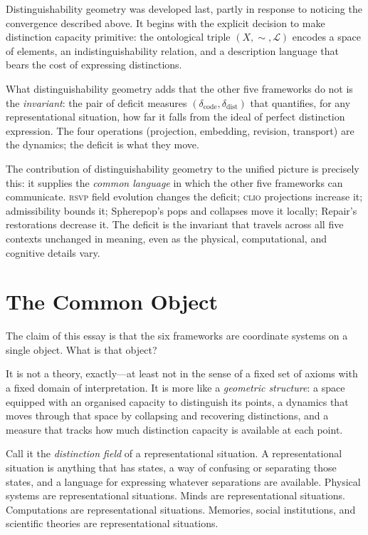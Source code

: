 \documentclass[12pt, letterpaper]{article}
\theoremstyle{remark}
\newcommand{\rsvp}{\textsc{rsvp}}
\newcommand{\clio}{\textsc{clio}}
\newcommand{\Dc}{\delta_{\mathrm{code}}}
\newcommand{\Dd}{\delta_{\mathrm{dist}}}
\begin{document}
Distinguishability geometry was developed last, partly in response to
noticing the convergence described above.  It begins with the explicit
decision to make distinction capacity primitive: the ontological triple
$(X, \sim, \mathcal{L})$ encodes a space of elements, an indistinguishability
relation, and a description language that bears the cost of expressing
distinctions.

What distinguishability geometry adds that the other five frameworks do not
is the \emph{invariant}: the pair of deficit measures $(\Dc, \Dd)$ that
quantifies, for any representational situation, how far it falls from the
ideal of perfect distinction expression.  The four operations (projection,
embedding, revision, transport) are the dynamics; the deficit is what
they move.

The contribution of distinguishability geometry to the unified picture is
precisely this: it supplies the \emph{common language} in which the other
five frameworks can communicate.  \rsvp{} field evolution changes the
deficit; \clio{} projections increase it; admissibility bounds it;
Spherepop's pops and collapses move it locally; Repair's restorations
decrease it.  The deficit is the invariant that travels across all five
contexts unchanged in meaning, even as the physical, computational, and
cognitive details vary.

\section{The Common Object}

The claim of this essay is that the six frameworks are coordinate systems
on a single object.  What is that object?

It is not a theory, exactly---at least not in the sense of a fixed set of
axioms with a fixed domain of interpretation.  It is more like a
\emph{geometric structure}: a space equipped with an organised capacity to
distinguish its points, a dynamics that moves through that space by
collapsing and recovering distinctions, and a measure that tracks how much
distinction capacity is available at each point.

Call it the \emph{distinction field} of a representational situation.
A representational situation is anything that has states, a way of
confusing or separating those states, and a language for expressing
whatever separations are available.  Physical systems are representational
situations.  Minds are representational situations.  Computations are
representational situations.  Memories, social institutions, and scientific
theories are representational situations.
\end{document}
